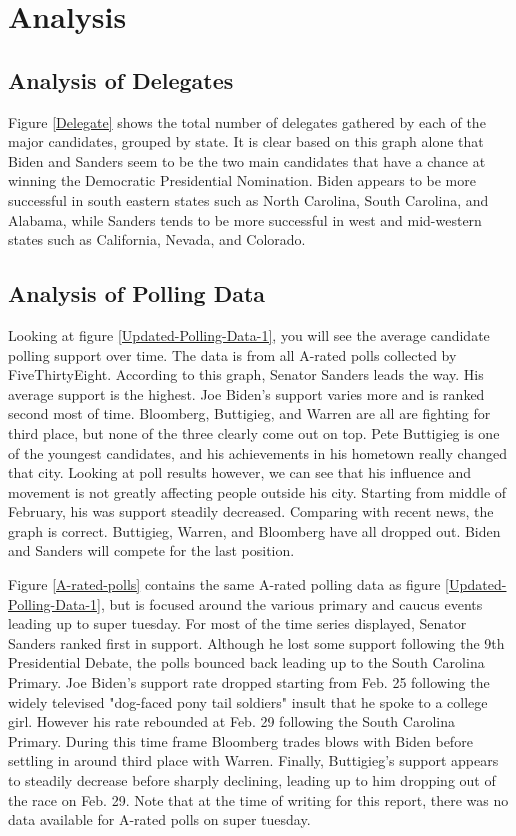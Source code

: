 \section{Analysis}\label{analysis}

\subsection{Analysis of Delegates}

Figure \ref{Delegate} shows the total number of delegates gathered by each of the major candidates, grouped by state. It is clear based on this graph alone that Biden and Sanders seem to be the two main candidates that have a chance at winning the Democratic Presidential Nomination. Biden appears to be more successful in south eastern states such as North Carolina, South Carolina, and Alabama, while Sanders tends to be more successful in west and mid-western states such as California, Nevada, and Colorado.

\subsection{Analysis of Polling Data}

Looking at figure \ref{Updated-Polling-Data-1}, you will see the average candidate polling support over time. The data is from all A-rated polls collected by FiveThirtyEight. According to this graph, Senator Sanders leads the way. His average support is the highest. Joe Biden's support varies more and is ranked second most of time. Bloomberg, Buttigieg, and Warren are all are fighting for third place, but none of the three clearly come out on top. Pete Buttigieg is one of the youngest candidates, and his achievements in his hometown really changed that city. Looking at poll results however, we can see that his influence and movement is not greatly affecting people outside his city. Starting from middle of February, his was support steadily decreased. Comparing with recent news, the graph is correct. Buttigieg, Warren, and Bloomberg have all dropped out. Biden and Sanders will compete for the last position.

Figure \ref{A-rated-polls} contains the same A-rated polling data as figure \ref{Updated-Polling-Data-1}, but is focused around the various primary and caucus events leading up to super tuesday. For most of the time series displayed, Senator Sanders ranked first in support. Although he lost some support following the 9th Presidential Debate, the polls bounced back leading up to the South Carolina Primary. Joe Biden's support rate dropped starting from Feb. 25 following the widely televised "dog-faced pony tail soldiers" insult that he spoke to a college girl. However his rate rebounded at Feb. 29 following the South Carolina Primary. During this time frame Bloomberg trades blows with Biden before settling in around third place with Warren. Finally, Buttigieg's support appears to steadily decrease before sharply declining, leading up to him dropping out of the race on Feb. 29. Note that at the time of writing for this report, there was no data available for A-rated polls on super tuesday.

